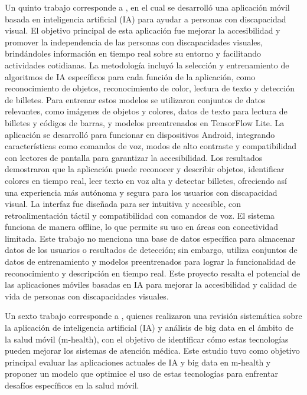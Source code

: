 Un quinto trabajo corresponde a \parencite{jagadish2024}, en el cual se desarrolló una aplicación móvil basada en inteligencia artificial (IA) para ayudar a personas con discapacidad visual. El objetivo principal de esta aplicación fue mejorar la accesibilidad y promover la independencia de las personas con discapacidades visuales, brindándoles información en tiempo real sobre su entorno y facilitando actividades cotidianas.
La metodología incluyó la selección y entrenamiento de algoritmos de IA específicos para cada función de la aplicación, como reconocimiento de objetos, reconocimiento de color, lectura de texto y detección de billetes. Para entrenar estos modelos se utilizaron conjuntos de datos relevantes, como imágenes de objetos y colores, datos de texto para lectura de billetes y códigos de barras, y modelos preentrenados en TensorFlow Lite. La aplicación se desarrolló para funcionar en dispositivos Android, integrando características como comandos de voz, modos de alto contraste y compatibilidad con lectores de pantalla para garantizar la accesibilidad.
Los resultados demostraron que la aplicación puede reconocer y describir objetos, identificar colores en tiempo real, leer texto en voz alta y detectar billetes, ofreciendo así una experiencia más autónoma y segura para los usuarios con discapacidad visual. La interfaz fue diseñada para ser intuitiva y accesible, con retroalimentación táctil y compatibilidad con comandos de voz. El sistema funciona de manera offline, lo que permite su uso en áreas con conectividad limitada.
Este trabajo no menciona una base de datos específica para almacenar datos de los usuarios o resultados de detección; sin embargo, utiliza conjuntos de datos de entrenamiento y modelos preentrenados para lograr la funcionalidad de reconocimiento y descripción en tiempo real. Este proyecto resalta el potencial de las aplicaciones móviles basadas en IA para mejorar la accesibilidad y calidad de vida de personas con discapacidades visuales.

Un sexto trabajo corresponde a \parencite{khan2020}, quienes realizaron una revisión sistemática sobre la aplicación de inteligencia artificial (IA) y análisis de big data en el ámbito de la salud móvil (m-health), con el objetivo de identificar cómo estas tecnologías pueden mejorar los sistemas de atención médica. Este estudio tuvo como objetivo principal evaluar las aplicaciones actuales de IA y big data en m-health y proponer un modelo que optimice el uso de estas tecnologías para enfrentar desafíos específicos en la salud móvil.

